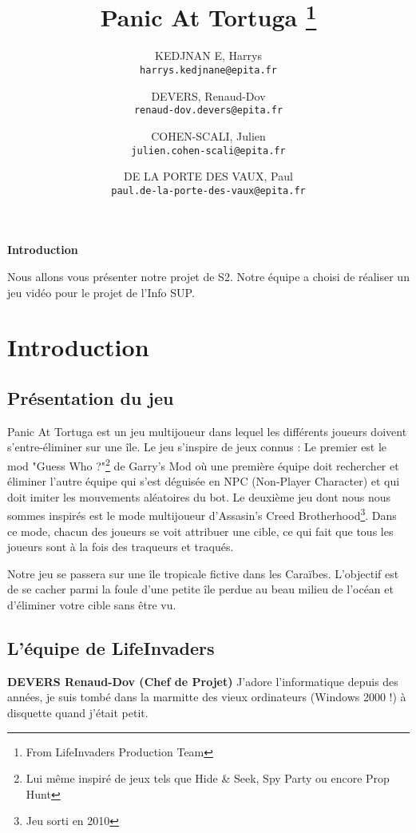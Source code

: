 \documentclass[french, 12pt, a4paper,twoside]{article}
\title{Panic At Tortuga \thanks{From LifeInvaders Production Team}}
\author{
    KEDJNAN
    E, Harrys\\
    \texttt{harrys.kedjnane@epita.fr}
    \and
    DEVERS, Renaud-Dov\\
    \texttt{renaud-dov.devers@epita.fr}
    \and
    COHEN-SCALI, Julien\\
    \texttt{julien.cohen-scali@epita.fr}
    \and
    DE LA PORTE DES VAUX, Paul\\
    \texttt{paul.de-la-porte-des-vaux@epita.fr}
    
}
\begin{document}
\begin{titlepage}
\maketitle
\end{titlepage}

\begin{center}
    \textbf{Introduction}

    Nous allons vous présenter notre projet de S2.
    Notre équipe a choisi de réaliser un jeu vidéo pour le projet de l'Info SUP.
\end{center}

\tableofcontents
\newpage

\section{Introduction}
\subsection{Présentation du jeu}
\begin{flushleft}
    Panic At Tortuga est un jeu multijoueur dans lequel les différents joueurs doivent s'entre-éliminer sur une île.
    Le jeu s'inspire de jeux connus : Le premier est le mod "Guess Who ?"\footnote{Lui même inspiré de jeux tels que Hide \& Seek, Spy Party ou encore Prop Hunt} de Garry's Mod
        où une première équipe doit rechercher et éliminer l'autre équipe qui s'est déguisée en NPC (Non-Player Character) et qui doit imiter les mouvements aléatoires du bot.
    Le deuxième jeu dont nous nous sommes inspirés est le mode multijoueur d'Assasin's Creed Brotherhood\footnote{Jeu sorti en 2010}.
    Dans ce mode, chacun des joueurs se voit attribuer une cible, ce qui fait que tous les joueurs sont à la fois des traqueurs et traqués.

    Notre jeu se passera sur une île tropicale fictive dans les Caraïbes.
    L'objectif est de se cacher parmi la foule d'une petite île perdue au beau milieu de l'océan et d'éliminer votre cible sans être vu.
\end{flushleft}

\subsection{L'équipe de LifeInvaders}
\textbf{DEVERS Renaud-Dov (Chef de Projet)} \newline
J'adore l'informatique depuis des années,
je suis tombé dans la marmitte des vieux ordinateurs (Windows 2000 !) à disquette quand j'était petit.
\end{document}

